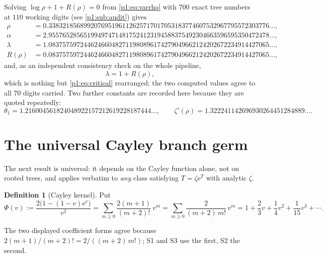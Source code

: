 \documentclass[11pt,a4paper,oneside]{book}
\theoremstyle{plain}
\theoremstyle{definition}
\newtheorem{definition}[theorem]{Definition}
\theoremstyle{remark}
\newcommand{\e}{\mathrm{e}}
\begin{document}
Solving $\log\rho+1+R(\rho)=0$ from \cref{p1:eq:varrho} with $700$ exact tree numbers at $110$
working digits (see \cref{p1:sub:audit}) gives
\begin{align}
 \rho&=0.338321856899207695196112625717017053183774607532967795572303776
 \ldots,
 \label{p1:eq:rho-numeric}\\
 \alpha&=2.955765285651994974714817524123194588375492304663596595350472478
 \ldots,
 \label{p1:eq:alpha-numeric}\\
 \lambda&=1.083757597244624660482711980896174279049662124202672234914427065
 \ldots,
 \label{p1:eq:lambda-numeric}\\
 R(\rho)&=0.083757597244624660482711980896174279049662124202672234914427065
 \ldots,
 \label{p1:eq:Rrho-numeric}
\end{align}
and, as an independent consistency check on the whole pipeline,
\begin{equation}
 \lambda=1+R(\rho),
 \label{p1:eq:lambda-check}
\end{equation}
which is nothing but \cref{p1:eq:critical} rearranged; the two computed values agree to all
$70$ digits carried.  Two further constants are recorded here because they are quoted
repeatedly:
\begin{equation}
 \theta_1=1.216004561824048922157212619228187444\ldots,
 \qquad
 \zeta'(\rho)=1.322241142696930264451284889\ldots .
 \label{p1:eq:theta1-numeric}
\end{equation}

\section{The universal Cayley branch germ}
\label{p1:sec:cayley}

The next result is universal: it depends on the Cayley function alone, not on rooted trees,
and applies verbatim to \emph{any} class satisfying $T=\zeta\e^{T}$ with analytic $\zeta$.

\begin{definition}[Cayley kernel]
\label{p1:def:cayley-kernel}
Put
\begin{equation}
 \Phi(v):=\frac{2\bigl(1-(1-v)\e^{v}\bigr)}{v^{2}}
 =\sum_{m\ge0}\frac{2(m+1)}{(m+2)!}\,v^{m}
 =\sum_{m\ge0}\frac{2}{(m+2)\,m!}\,v^{m}
 =1+\frac23v+\frac14v^{2}+\frac1{15}v^{3}+\cdots .
 \label{p1:eq:Phi}
\end{equation}
\end{definition}

The two displayed coefficient forms agree because $2(m+1)/(m+2)!=2/((m+2)\,m!)$; \textsf{S1}
and \textsf{S3} use the first, \textsf{S2} the second.
\end{document}
